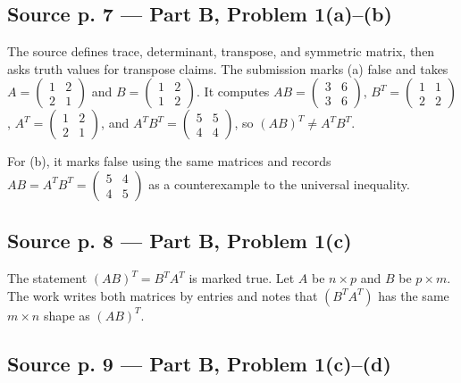 \subsection{Source p. 7 --- Part B, Problem 1(a)--(b)}

The source defines trace, determinant, transpose, and symmetric matrix, then asks truth values for transpose claims. The submission marks (a) false and takes \(A = \begin{pmatrix}
1 & 2 \\
2 & 1
\end{pmatrix}\) and \(B = \begin{pmatrix}
1 & 2 \\
1 & 2
\end{pmatrix}\). It computes \(AB = \begin{pmatrix}
3 & 6 \\
3 & 6
\end{pmatrix}\), \(B^{T} = \begin{pmatrix}
1 & 1 \\
2 & 2
\end{pmatrix}\), \(A^{T} = \begin{pmatrix}
1 & 2 \\
2 & 1
\end{pmatrix}\), and \(A^{T}B^{T} = \begin{pmatrix}
5 & 5 \\
4 & 4
\end{pmatrix}\), so \(\left( {AB} \right)^{T} \neq A^{T}B^{T}\).

For (b), it marks false using the same matrices and records \(AB = A^{T}B^{T} = \begin{pmatrix}
5 & 4 \\
4 & 5
\end{pmatrix}\) as a counterexample to the universal inequality.

\subsection{Source p. 8 --- Part B, Problem 1(c)}

The statement \(\left( {AB} \right)^{T} = B^{T}A^{T}\) is marked true. Let \(A\) be \(n \times p\) and \(B\) be \(p \times m\). The work writes both matrices by entries and notes that \(\left( {B^{T}A^{T}} \right)\) has the same \(m \times n\) shape as \(\left( {AB} \right)^{T}\).

\subsection{Source p. 9 --- Part B, Problem 1(c)--(d)}

